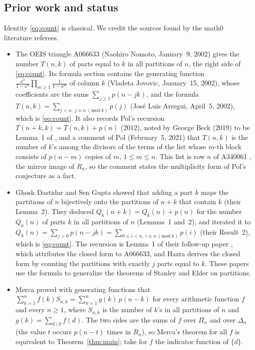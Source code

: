 \documentclass[11pt]{amsart}
\theoremstyle{plain}
\theoremstyle{definition}
\begin{document}
\subsection*{Prior work and status}
Identity \eqref{eq:count} is classical. We credit the sources found by the math0 literature referees.
\begin{itemize}
\item The OEIS triangle A066633 \cite{A066633} (Naohiro Nomoto, January~9, 2002) gives the number $T(n,k)$ of parts equal to $k$ in all partitions of $n$, the right side of \eqref{eq:count}.
Its formula section contains the generating function $\frac{x^k}{1-x^k}\prod_{m\ge1}\frac{1}{1-x^m}$ of column $k$ (Vladeta Jovovic, January~15, 2002), whose coefficients are the sums $\sum_{j\ge1}p(n-jk)$, and the formula $T(n,k)=\sum_{j<n,\ j\equiv n\ (\mathrm{mod}\ k)}p(j)$ (Jos\'e Luis Arregui, April~5, 2002), which is \eqref{eq:count}.
It also records Pol's recursion $T(n+k,k)=T(n,k)+p(n)$ (2012), noted by George Beck (2019) to be Lemma~1 of \cite{DS11}, and a comment of Pol (February~5, 2021) that $T(n,k)$ is the number of $k$'s among the divisors of the terms of the list whose $m$-th block consists of $p(n-m)$ copies of $m$, $1\le m\le n$. This list is row $n$ of A340061 \cite{A340061}, the mirror image of $R_n$, so the comment states the multiplicity form of Pol's conjecture as a fact.
\item Ghosh Dastidar and Sen Gupta \cite{DS10} showed that adding a part $k$ maps the partitions of $n$ bijectively onto the partitions of $n+k$ that contain $k$ (their Lemma~2). They deduced $Q_k(n+k)=Q_k(n)+p(n)$ for the number $Q_k(n)$ of parts $k$ in all partitions of $n$ (Lemmas~1 and~2), and iterated it to $Q_k(n)=\sum_{j>0}p(n-jk)=\sum_{0\le i<n,\ i\equiv n\ (\mathrm{mod}\ k)}p(i)$ (their Result~2), which is \eqref{eq:count}.
The recursion is Lemma~1 of their follow-up paper \cite{DS11}, which attributes the closed form to A066633, and Hazra \cite[Lemma~1.2]{Haz16} derives the closed form by counting the partitions with exactly $j$ parts equal to $k$. These papers use the formula to generalize the theorems of Stanley and Elder on partitions.
\item Merca \cite[Theorem~1]{Mer23} proved with generating functions that $\sum_{k=1}^{n}f(k)S_{n,k}=\sum_{k=1}^{n}g(k)\,p(n-k)$ for every arithmetic function $f$ and every $n\ge1$, where $S_{n,k}$ is the number of $k$'s in all partitions of $n$ and $g(k)=\sum_{d\mid k}f(d)$.
The two sides are the sums of $f$ over $\Pi_n$ and over $\Delta_n$ (the value $t$ occurs $p(n-t)$ times in $R_n$), so Merca's theorem for all $f$ is equivalent to Theorem~\ref{thm:main}; take for $f$ the indicator function of $\{d\}$.

\end{itemize}
\end{document}
